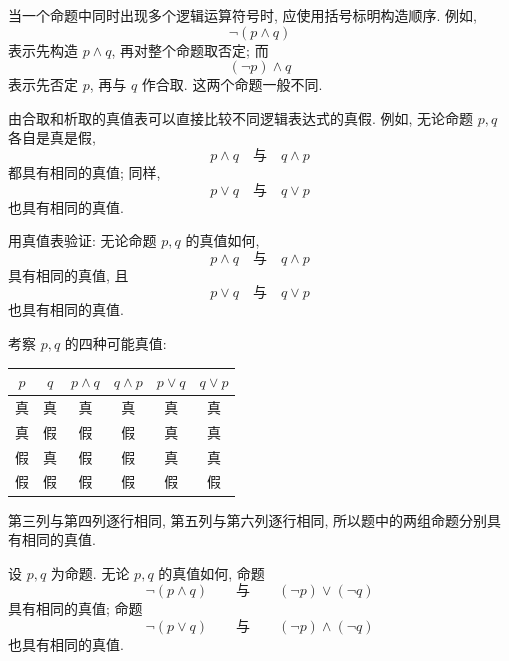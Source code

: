 \documentclass[usesamecnt, thmcnt=section, lang=cn, newtx, 10pt, scheme=chinese]{elegantbook}
\begin{document}
\begin{remark}
当一个命题中同时出现多个逻辑运算符号时, 应使用括号标明构造顺序. 例如,
\[
 \neg(p\wedge q)
\]
表示先构造 $p\wedge q$, 再对整个命题取否定; 而
\[
 (\neg p)\wedge q
\]
表示先否定 $p$, 再与 $q$ 作合取. 这两个命题一般不同.
\end{remark}

由合取和析取的真值表可以直接比较不同逻辑表达式的真假. 例如, 无论命题 $p,q$ 各自是真是假,
\[
 p\wedge q\quad\text{与}\quad q\wedge p
\]
都具有相同的真值; 同样,
\[
 p\vee q\quad\text{与}\quad q\vee p
\]
也具有相同的真值. 

\begin{concept}
\label{con:logic-04}
用真值表验证: 无论命题 $p,q$ 的真值如何,
\[
 p\wedge q\quad\text{与}\quad q\wedge p
\]
具有相同的真值, 且
\[
 p\vee q\quad\text{与}\quad q\vee p
\]
也具有相同的真值.
\end{concept}

\begin{solution}
考察 $p,q$ 的四种可能真值:
\begin{table}[H]
\centering
\begin{tabular}{|c|c|c|c|c|c|}
\hline
$p$ & $q$ & $p\wedge q$ & $q\wedge p$ & $p\vee q$ & $q\vee p$\\
\hline
真 & 真 & 真 & 真 & 真 & 真\\
真 & 假 & 假 & 假 & 真 & 真\\
假 & 真 & 假 & 假 & 真 & 真\\
假 & 假 & 假 & 假 & 假 & 假\\
\hline
\end{tabular}
\end{table}
第三列与第四列逐行相同, 第五列与第六列逐行相同, 所以题中的两组命题分别具有相同的真值.
\end{solution}

\begin{theorem}[De Morgan 律]\label{thm:de-morgan}
设 $p,q$ 为命题. 无论 $p,q$ 的真值如何, 命题
\[
 \neg(p\wedge q)
 \qquad\text{与}\qquad
 (\neg p)\vee(\neg q)
\]
具有相同的真值; 命题
\[
 \neg(p\vee q)
 \qquad\text{与}\qquad
 (\neg p)\wedge(\neg q)
\]
也具有相同的真值.
\end{theorem}
\end{document}
